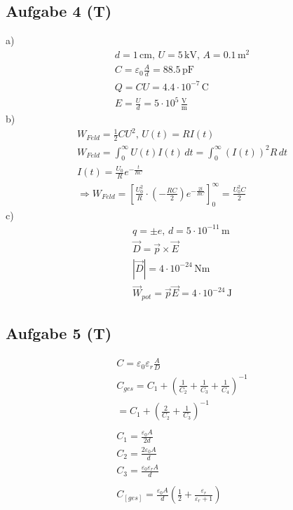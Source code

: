 \documentclass{article}
\begin{document}
\subsection*{Aufgabe 4 (T)}
a)\begin{eqnarray*}
    d=1\,\mathrm{cm},\,U=5\,\mathrm{kV},\,A=0.1\,\mathrm{m^2}\\
    C=\varepsilon_0\frac{A}{d}=88.5\,\mathrm{pF}\\
    Q=CU=4.4\cdot 10^{-7}\,\mathrm{C}\\
    E=\frac{U}{d}=5\cdot 10^5\,\mathrm{\frac{V}{m}}
\end{eqnarray*}
b)\begin{eqnarray*}
    W_{Feld}=\frac{1}{2}CU^2,\,U(t)=RI(t)\\
    W_{Feld}=\int_{0}^{\infty}U(t)I(t)\,dt=\int_{0}^{\infty}(I(t))^2R\,dt\\
    I(t)=\frac{U_0}{R}e^{-\frac{t}{RC}}\\
    \Rightarrow W_{Feld} = \left[\frac{U_0^2}{R}\cdot\left(-\frac{RC}{2}\right)e^{-\frac{2t}{RC}}\right]_0^{\infty}=\frac{U_0^2C}{2}
\end{eqnarray*}
c)\begin{eqnarray*}
    q=\pm e,\,d=5\cdot 10^{-11}\,\mathrm{m}\\
    \vec{D}=\vec{p}\times \vec{E}\\
    |\vec{D}| = 4\cdot 10^{-24}\,\mathrm{Nm}\\
    \vec{W}_{pot}=\vec{p}\vec{E}=4\cdot 10^{-24}\,\mathrm{J}
\end{eqnarray*}

\subsection{Aufgabe 5 (T)}
\begin{eqnarray*}
    C=\varepsilon_0\varepsilon_r\frac{A}{D}\\
    C_{ges}=C_1+\left(\frac{1}{C_2}+\frac{1}{C_3}+\frac{1}{C_4}\right)^{-1}\\
    =C_1+\left(\frac{2}{C_2}+\frac{1}{C_3}\right)^{-1}\\\\
    C_1 =\frac{\varepsilon_0 A}{2d}\\
    C_2 =\frac{2\varepsilon_0 A}{d}\\
    C_3 =\frac{\varepsilon_0\varepsilon_rA}{d}\\\\
    C_[ges]=\frac{\varepsilon_0A}{d}\left(\frac{1}{2}+\frac{\varepsilon_r}{\varepsilon_r+1}\right)
\end{eqnarray*}
\end{document}
